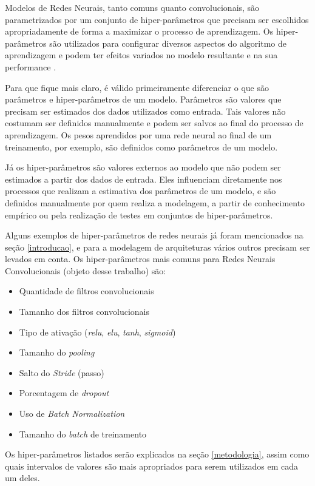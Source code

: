 \documentclass[
12pt,				%
openright,			%
oneside,			%
a4paper,			%
english,			%
french,				%
spanish,			%
brazil				%
]{abntex2}
\begin{document}
Modelos de Redes Neurais, tanto comuns quanto convolucionais, são parametrizados por um conjunto de hiper-parâmetros que precisam ser escolhidos apropriadamente de forma a maximizar o processo de aprendizagem. Os hiper-parâmetros são utilizados para configurar diversos aspectos do algoritmo de aprendizagem e podem ter efeitos variados no modelo resultante e na sua performance \cite{ClaesenM15}.

Para que fique mais claro, é válido primeiramente diferenciar o que são parâmetros e hiper-parâmetros de um modelo. Parâmetros são valores que precisam ser estimados dos dados utilizados como entrada. Tais valores não costumam ser definidos manualmente e podem ser salvos ao final do processo de aprendizagem. Os pesos aprendidos por uma rede neural ao final de um treinamento, por exemplo, são definidos como parâmetros de um modelo.

Já os hiper-parâmetros são valores externos ao modelo que não podem ser estimados a partir dos dados de entrada. Eles influenciam diretamente nos processos que realizam a estimativa dos parâmetros de um modelo, e são definidos manualmente por quem realiza a modelagem, a partir de conhecimento empírico ou pela realização de testes em conjuntos de hiper-parâmetros.

Alguns exemplos de hiper-parâmetros de redes neurais já foram mencionados na seção \ref{introducao}, e para a modelagem de arquiteturas vários outros precisam ser levados em conta. Os hiper-parâmetros mais comuns para Redes Neurais Convolucionais (objeto desse trabalho) são:

\begin{itemize}
    \item Quantidade de filtros convolucionais
    \item Tamanho dos filtros convolucionais
    \item Tipo de ativação (\textit{relu}, \textit{elu}, \textit{tanh}, \textit{sigmoid})
    \item Tamanho do \textit{pooling}
    \item Salto do \textit{Stride} (passo)
    \item Porcentagem de \textit{dropout}
    \item Uso de \textit{Batch Normalization}
    \item Tamanho do \textit{batch} de treinamento
\end{itemize}

Os hiper-parâmetros listados serão explicados na seção \ref{metodologia}, assim como quais intervalos de valores são mais apropriados para serem utilizados em cada um deles.
\end{document}
